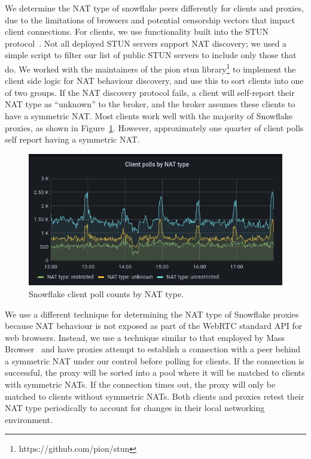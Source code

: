 \documentclass[letterpaper,twocolumn]{article}
\begin{document}
We determine the NAT type of snowflake peers differently for clients and proxies, due to the
limitations of browsers and potential censorship vectors that impact client connections.
For clients, we use functionality built into the STUN protocol~\cite{rfc5780}. Not all deployed STUN
servers support NAT discovery; we used a simple script to filter our list of public STUN servers
to include only those that do. We worked with the maintainers of
the pion stun library\footnote{https://github.com/pion/stun} to implement the client side logic
for NAT behaviour discovery, and use this to sort clients into one of two groups.
If the NAT discovery protocol fails, a client will self-report their NAT
type as ``unknown'' to the broker, and the broker assumes these clients to have a symmetric NAT.
Most clients work well with the majority of Snowflake proxies, as
shown in Figure~\ref{fig:clients-by-nat}. However, approximately one quarter of client polls self
report having a symmetric NAT.

\begin{figure}
\centering
    \includegraphics[width=\columnwidth]{figures/clients-by-nat}
    \caption{Snowflake client poll counts by NAT type. }
    \label{fig:clients-by-nat}
\end{figure}

We use a different technique for determining the NAT type of Snowflake proxies because
NAT behaviour is not exposed as part of the WebRTC standard API for web browsers.
Instead, we use a technique similar to that employed by Mass Browser~\cite{Nasr2020a}
and have proxies attempt to establish a connection with a peer behind a symmetric NAT under our
control before polling for clients. If the connection is successful, the proxy will be sorted into
a pool where it will be matched to clients with symmetric NATs. If the connection times out,
the proxy will only be matched to clients without symmetric NATs. Both clients and proxies
retest their NAT type periodically to account for changes in their local networking
environment.
\end{document}

